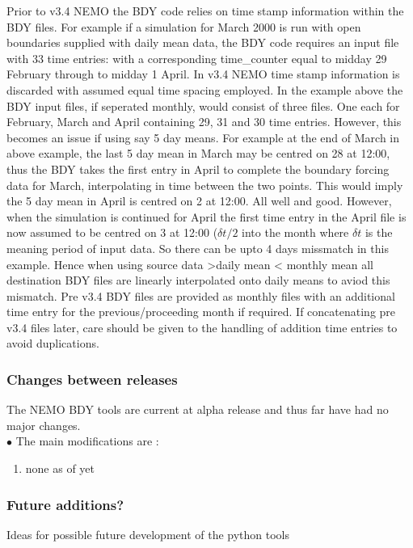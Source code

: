 Prior to v3.4 NEMO the BDY code relies on time stamp information within the BDY
files. For example if a simulation for March 2000 is run with open boundaries 
supplied with daily mean data, the BDY code requires an input file with 33 time entries:
with a corresponding time\_counter equal to midday 29 February through to midday
1 April. In v3.4 NEMO time stamp information is discarded with assumed equal time spacing
employed. In the example above the BDY input files, if seperated monthly, would consist of 
three files. One each for February, March and April containing 29, 31 and 30 time entries.
However, this becomes an issue if using say 5 day means. For example at the end of March in 
above example, the last 5 day mean in March may be centred on 28 at 12:00, thus the BDY 
takes the first entry in April to complete the boundary forcing data for March, interpolating
in time between the two points. This would imply the 5 day mean in April is centred on
2 at 12:00. All well and good. However, when the simulation is continued for April
the first time entry in the April file is now assumed to be centred on 3 at 12:00 ($\delta t/2$
into the month where $\delta t$ is the meaning period of input data. So there can be upto
4 days missmatch in this example. Hence when using source data >daily mean < monthly mean
all destination BDY files are linearly interpolated onto daily means to aviod this 
mismatch. Pre v3.4 BDY files are provided as monthly files with an additional time entry
for the previous/proceeding month if required. If concatenating pre v3.4 files later, care 
should be given to the handling of addition time entries to avoid duplications.

\subsubsection{Changes between releases}
The NEMO BDY tools are current at alpha release and thus far have had no major
changes.\\

$\bullet$ The main modifications are :\\
\begin{enumerate}
\item none as of yet
\end{enumerate}


\subsubsection{Future additions?}
Ideas for possible future development of the python tools

